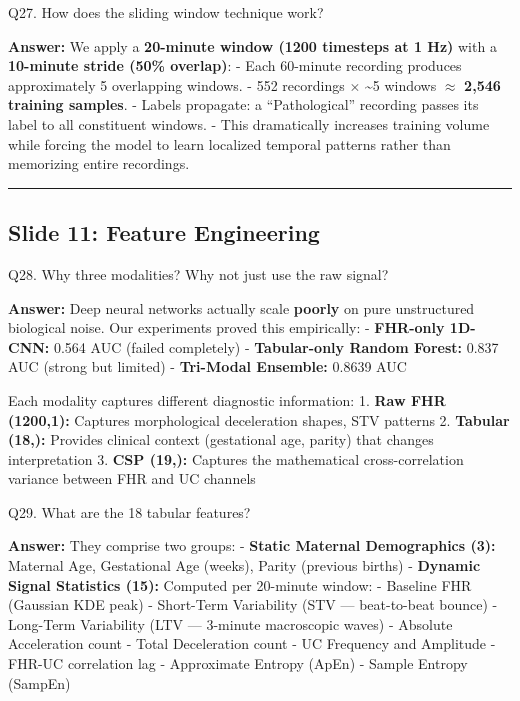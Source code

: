 \documentclass[11pt,a4paper]{article}
\begin{document}
\begin{questionbox}
Q27. How does the sliding window technique work?
\end{questionbox}
\textbf{Answer:} We apply a \textbf{20-minute window (1200 timesteps at 1
Hz)} with a \textbf{10-minute stride (50\% overlap)}: - Each 60-minute
recording produces approximately 5 overlapping windows. - 552 recordings
$\times$ \textasciitilde5 windows $\approx$ \textbf{2,546 training samples}. - Labels
propagate: a ``Pathological'' recording passes its label to all
constituent windows. - This dramatically increases training volume while
forcing the model to learn localized temporal patterns rather than
memorizing entire recordings.

\begin{center}\rule{0.5\linewidth}{0.5pt}\end{center}

\subsection{Slide 11: Feature
Engineering}\label{slide-11-feature-engineering}

\begin{questionbox}
Q28. Why three modalities? Why not just use the raw signal?
\end{questionbox}
\textbf{Answer:} Deep neural networks actually scale \textbf{poorly} on pure
unstructured biological noise. Our experiments proved this empirically:
- \textbf{FHR-only 1D-CNN:} 0.564 AUC (failed completely) -
\textbf{Tabular-only Random Forest:} 0.837 AUC (strong but limited) -
\textbf{Tri-Modal Ensemble:} 0.8639 AUC

Each modality captures different diagnostic information: 1. \textbf{Raw
FHR (1200,1):} Captures morphological deceleration shapes, STV patterns
2. \textbf{Tabular (18,):} Provides clinical context (gestational age,
parity) that changes interpretation 3. \textbf{CSP (19,):} Captures the
mathematical cross-correlation variance between FHR and UC channels

\begin{questionbox}
Q29. What are the 18 tabular features?
\end{questionbox}
\textbf{Answer:} They comprise two groups: - \textbf{Static Maternal
Demographics (3):} Maternal Age, Gestational Age (weeks), Parity
(previous births) - \textbf{Dynamic Signal Statistics (15):} Computed
per 20-minute window: - Baseline FHR (Gaussian KDE peak) - Short-Term
Variability (STV --- beat-to-beat bounce) - Long-Term Variability (LTV
--- 3-minute macroscopic waves) - Absolute Acceleration count - Total
Deceleration count - UC Frequency and Amplitude - FHR-UC correlation lag
- Approximate Entropy (ApEn) - Sample Entropy (SampEn)
\end{document}
